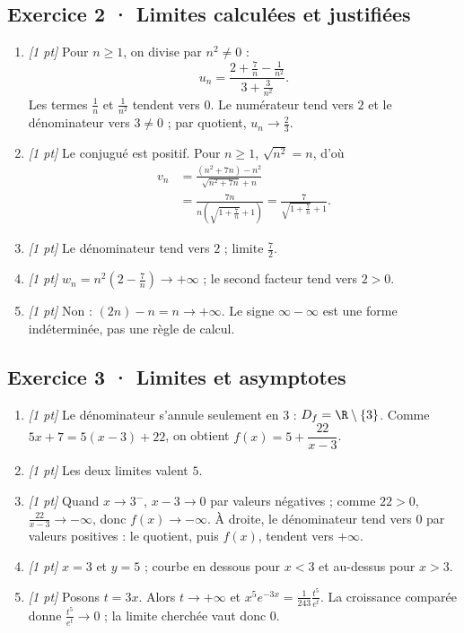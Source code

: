 \subsection*{Exercice 2 · Limites calculées et justifiées}\begin{enumerate}

\item \textit{[1 pt]} Pour $n\ge1$, on divise par $n^2\ne0$ :
\[u_n=\frac{2+\frac{7}{n}-\frac{1}{n^2}}{3+\frac{3}{n^2}}.\]
Les termes $\frac{1}{n}$ et $\frac{1}{n^2}$ tendent vers $0$. Le numérateur tend vers $2$ et le dénominateur vers $3\ne0$ ; par quotient, $u_n\to\frac{2}{3}$.

\item \textit{[1 pt]} Le conjugué est positif. Pour $n\ge1$, $\sqrt{n^2}=n$, d'où
\[\begin{aligned}v_n&=\frac{(n^2+7n)-n^2}{\sqrt{n^2+7n}+n}\\&=\frac{7n}{n(\sqrt{1+\frac{7}{n}}+1)}=\frac{7}{\sqrt{1+\frac{7}{n}}+1}.\end{aligned}\]

\item \textit{[1 pt]} Le dénominateur tend vers $2$ ; limite $\frac{7}{2}$.

\item \textit{[1 pt]} $w_n=n^2(2-\frac{7}{n})\to+\infty$ ; le second facteur tend vers $2>0$.

\item \textit{[1 pt]} Non : $(2n)-n=n\to+\infty$. Le signe $\infty-\infty$ est une forme indéterminée, pas une règle de calcul.

\end{enumerate}

\subsection*{Exercice 3 · Limites et asymptotes}\begin{enumerate}

\item \textit{[1 pt]} Le dénominateur s'annule seulement en $3$ : $D_f=\R\setminus\{3\}$. Comme $5x+7=5(x-3)+22$, on obtient $f(x)=5+\dfrac{22}{x-3}$.

\item \textit{[1 pt]} Les deux limites valent $5$.

\item \textit{[1 pt]} Quand $x\to 3^-$, $x-3\to0$ par valeurs négatives ; comme $22>0$, $\frac{22}{x-3}\to-\infty$, donc $f(x)\to-\infty$. À droite, le dénominateur tend vers $0$ par valeurs positives : le quotient, puis $f(x)$, tendent vers $+\infty$.

\item \textit{[1 pt]} $x=3$ et $y=5$ ; courbe en dessous pour $x<3$ et au-dessus pour $x>3$.

\item \textit{[1 pt]} Posons $t=3x$. Alors $t\to+\infty$ et $x^5e^{-3x}=\frac{1}{243}\frac{t^5}{e^t}$. La croissance comparée donne $\frac{t^5}{e^t}\to0$ ; la limite cherchée vaut donc $0$.

\end{enumerate}

